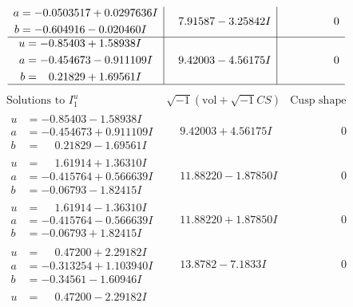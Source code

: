 \documentclass[1p]{elsarticle_modified}
\theoremstyle{definition}
\newcommand{\I}{\sqrt{-1}}
\begin{document}
$$\begin{array}{c|c|c}
\begin{aligned}
a &= -0.0503517 + 0.0297636 I \\
b &= -0.604916 - 0.020460 I\end{aligned}
 & \phantom{-}7.91587 - 3.25842 I & \phantom{-0.000000 } 0 \\ \hline\begin{aligned}
u &= -0.85403 + 1.58938 I \\
a &= -0.454673 - 0.911109 I \\
b &= \phantom{-}0.21829 + 1.69561 I\end{aligned}
 & \phantom{-}9.42003 - 4.56175 I & \phantom{-0.000000 } 0\\
 \hline 
 \end{array}$$\newpage$$\begin{array}{c|c|c}  
\text{Solutions to }I^u_{1}& \I (\text{vol} + \sqrt{-1}CS) & \text{Cusp shape}\\
 \hline 
\begin{aligned}
u &= -0.85403 - 1.58938 I \\
a &= -0.454673 + 0.911109 I \\
b &= \phantom{-}0.21829 - 1.69561 I\end{aligned}
 & \phantom{-}9.42003 + 4.56175 I & \phantom{-0.000000 } 0 \\ \hline\begin{aligned}
u &= \phantom{-}1.61914 + 1.36310 I \\
a &= -0.415764 + 0.566639 I \\
b &= -0.06793 - 1.82415 I\end{aligned}
 & \phantom{-}11.88220 - 1.87850 I & \phantom{-0.000000 } 0 \\ \hline\begin{aligned}
u &= \phantom{-}1.61914 - 1.36310 I \\
a &= -0.415764 - 0.566639 I \\
b &= -0.06793 + 1.82415 I\end{aligned}
 & \phantom{-}11.88220 + 1.87850 I & \phantom{-0.000000 } 0 \\ \hline\begin{aligned}
u &= \phantom{-}0.47200 + 2.29182 I \\
a &= -0.313254 + 1.103940 I \\
b &= -0.34561 - 1.60946 I\end{aligned}
 & \phantom{-}13.8782 - 7.1833 I & \phantom{-0.000000 } 0 \\ \hline\begin{aligned}
u &= \phantom{-}0.47200 - 2.29182 I \\

\end{aligned}
\end{array}$$
\end{document}
